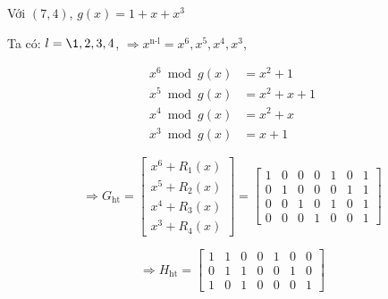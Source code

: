 \documentclass[12pt]{article}
\begin{document}
Với $(7,4)$, $g(x) = 1 + x + x^3$

Ta có: $l = \1,2,3,4$, $\Rightarrow x^\text{n-l} = x^6, x^5, x^4, x^3$, 

\begin{align*}
x^6 \bmod g(x) &= x^2 + 1 \\
x^5 \bmod g(x) &= x^2 + x + 1 \\
x^4 \bmod g(x) &= x^2 + x \\
x^3 \bmod g(x) &= x + 1
\end{align*}


\[
\Rightarrow G_{\text{ht}} = 
\begin{bmatrix}
x^6 + R_1(x) \\
x^5 + R_2(x) \\
x^4 + R_3(x) \\
x^3 + R_4(x)
\end{bmatrix}
=
\begin{bmatrix}
1 & 0 & 0 & 0 & 1 & 0 & 1 \\
0 & 1 & 0 & 0 & 0 & 1 & 1 \\
0 & 0 & 1 & 0 & 1 & 0 & 1 \\
0 & 0 & 0 & 1 & 0 & 0 & 1
\end{bmatrix}
\]

\[
\Rightarrow H_{\text{ht}} = 
\begin{bmatrix}
1 & 1 & 0 & 0 & 1 & 0 & 0 \\
0 & 1 & 1 & 0 & 0 & 1 & 0 \\
1 & 0 & 1 & 0 & 0 & 0 & 1
\end{bmatrix}
\]
\end{document}
